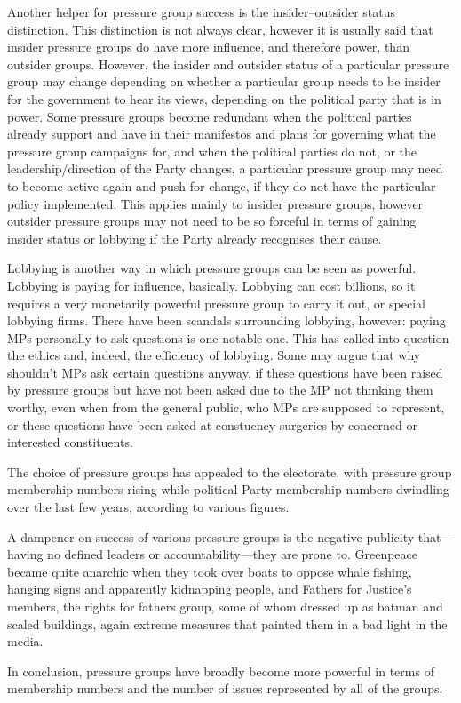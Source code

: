 \documentclass[11pt, a4paper]{article}
\begin{document}
Another helper for pressure group success is the insider--outsider status distinction.  This distinction is not always clear, however it is usually said that insider pressure groups do have more influence, and therefore power, than outsider groups.  However, the insider and outsider status of a particular pressure group may change depending on whether a particular group needs to be insider for the government to hear its views, depending on the political party that is in power.  Some pressure groups become redundant when the political parties already support and have in their manifestos and plans for governing what the pressure group campaigns for, and when the political parties do not, or the leadership\slash direction of the Party changes, a particular pressure group may need to become active again and push for change, if they do not have the particular policy implemented.  This applies mainly to insider pressure groups, however outsider pressure groups may not need to be so forceful in terms of gaining insider status or lobbying if the Party already recognises their cause.

Lobbying is another way in which pressure groups can be seen as powerful.  Lobbying is paying for influence, basically.  Lobbying can cost billions, so it requires a very monetarily powerful pressure group to carry it out, or special lobbying firms.  There have been scandals surrounding lobbying, however: paying MPs personally to ask questions is one notable one.  This has called into question the ethics and, indeed, the efficiency of lobbying.  Some may argue that why shouldn't MPs ask certain questions anyway, if these questions have been raised by pressure groups but have not been asked due to the MP not thinking them worthy, even when from the general public, who MPs are supposed to represent, or these questions have been asked at constuency surgeries by concerned or interested constituents.

The choice of pressure groups has appealed to the electorate, with pressure group membership numbers rising while political Party membership numbers dwindling over the last few years, according to various figures.

A dampener on success of various pressure groups is the negative publicity
that---having no defined leaders or accountability---they are prone to.
Greenpeace became quite anarchic when they took over boats to oppose whale
fishing, hanging signs and apparently kidnapping people, and Fathers for
Justice's members, the rights for fathers group, some of whom dressed up as
batman and scaled buildings, again extreme measures that painted them in a
bad light in the media.

In conclusion, pressure groups have broadly become more powerful in terms of membership numbers and the number of issues represented by all of the groups.
\end{document}
